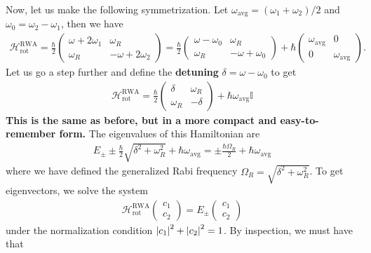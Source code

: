 \documentclass{book}
\theoremstyle{definition}
\newcommand{\RWA}{\ham_\text{rot}^\text{RWA}}
\newcommand{\ham}{\mathcal{H}}
\newcommand{\f}[2]{\frac{#1}{#2}}
\begin{document}
	
	
	
	
	
	
	
	
	
	Now, let us make the following symmetrization. Let $\omega_\text{avg} = (\omega_1 + \omega_2)/2$ and $\omega_0 = \omega_2 - \omega_1$, then we have
	\begin{align*}
		\RWA = \f{\hbar}{2} \begin{pmatrix}
			\omega +  2\omega_1 & \omega_R \\ 
			\omega_R  & -\omega + 2\omega_2
		\end{pmatrix}
		= 
		\f{\hbar}{2} \begin{pmatrix}
			\omega -  \omega_0 & \omega_R \\ 
			\omega_R  & -\omega +\omega_0 
		\end{pmatrix}
		+ \hbar \begin{pmatrix}
			\omega_\text{avg} & 0 \\ 0 & \omega_\text{avg}
		\end{pmatrix}.
	\end{align*}
	Let us go a step further and define the \textbf{detuning} $\delta = \omega - \omega_0$ to get
	\begin{align*}
		\boxed{\RWA = \f{\hbar}{2}\begin{pmatrix}
			\delta & \omega_R \\  \omega_R & -\delta
		\end{pmatrix} + \hbar \omega_\text{avg} \mathbb{I}}
	\end{align*}
	\textbf{This is the same as before, but in a more compact and easy-to-remember form.} The eigenvalues of this Hamiltonian are
	\begin{align*}
		E_\pm \pm \f{\hbar}{2}\sqrt{\delta^2 + \omega_R^2} + \hbar \omega_\text{avg} = \pm \f{\hbar \Omega_R}{2} + \hbar \omega_\text{avg}
	\end{align*}
	where we have defined the generalized Rabi frequency $\Omega_R = \sqrt{\delta^2 + \omega_R^2}$. To get eigenvectors, we solve the system 
	\begin{align*}
		\RWA \begin{pmatrix}
			c_1 \\ c_2
		\end{pmatrix} = E_\pm \begin{pmatrix}
			c_1 \\ c_2
		\end{pmatrix}
	\end{align*}	
	under the normalization condition $\abs{c_1}^2 + \abs{c_2}^2 = 1$. By inspection, we must have that
\end{document}
